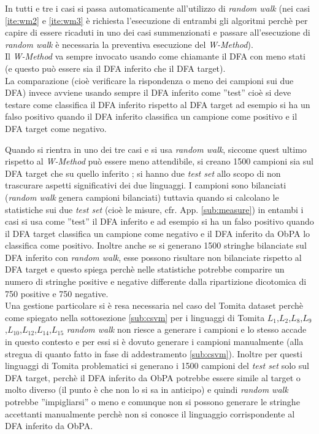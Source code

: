 In tutti e tre i casi si passa automaticamente  all'utilizzo di \textit{random walk} (nei casi \ref{ite:wm2} e \ref{ite:wm3} è richiesta l'esecuzione di entrambi gli algoritmi perchè per capire di essere ricaduti in uno dei casi summenzionati e passare all'esecuzione di \textit{random walk} è necessaria la preventiva esecuzione del \textit{W-Method}).  \\
Il \textit{W-Method} va sempre invocato usando come chiamante il \ac{DFA} con meno stati  (e questo può essere sia il \ac{DFA} inferito che il \ac{DFA} target).\\
La comparazione (cioè verificare la rispondenza o meno dei campioni sui due \ac{DFA}) invece avviene usando sempre il \ac{DFA} inferito come ''test'' cioè si deve testare come classifica il \ac{DFA} inferito rispetto al \ac{DFA} target ad esempio si ha un falso positivo quando il \ac{DFA} inferito classifica un campione come positivo e il \ac{DFA} target come negativo.

Quando si rientra in uno dei tre casi e si usa \textit{random walk}, siccome quest ultimo rispetto al \textit{W-Method} può essere meno attendibile, si creano 1500 campioni sia sul \ac{DFA} target che su quello inferito ; si hanno due \textit{test set}  allo scopo di non trascurare aspetti significativi dei due linguaggi.  I campioni  sono bilanciati (\textit{random walk} genera campioni bilanciati)  tuttavia quando si calcolano le statistiche sui due \textit{test set} (cioè le misure, cfr. App. \ref{sub:measure}) in entambi i casi si usa come ''test'' il \ac{DFA} inferito e ad esempio si ha un falso positivo quando il \ac{DFA} target classifica un campione come negativo e il \ac{DFA} inferito da \ac{ObPA} lo classifica come positivo. Inoltre anche se si generano 1500 stringhe bilanciate sul \ac{DFA} inferito con \textit{random walk}, esse possono risultare non bilanciate rispetto al \ac{DFA} target e questo spiega perchè nelle statistiche potrebbe comparire un numero di stringhe positive e negative differente dalla ripartizione dicotomica di 750 positive e 750 negative.\\
Una gestione particolare si è resa necessaria nel caso del Tomita dataset perchè come spiegato   nella sottosezione \ref{sub:csvm} per i linguaggi di Tomita $L_1$,$L_2$,$L_8$,$L_9$,$L_{10}$,$L_{12}$,$L_{14}$,$L_{15}$  \textit{random walk} non riesce a generare i campioni e lo stesso accade in questo contesto e per essi si è dovuto generare i campioni manualmente (alla stregua di quanto fatto in fase di addestramento \ref{sub:csvm}). Inoltre per questi linguaggi di Tomita problematici si generano i 1500 campioni del \textit{test set} solo sul \ac{DFA} target, perchè il \ac{DFA} inferito da \ac{ObPA} potrebbe essere simile al target o molto diverso (il punto è che non lo si sa in anticipo) e quindi \textit{random walk} potrebbe ''impigliarsi'' o meno e comunque non si possono generare le stringhe accettanti manualmente perchè non si conosce il linguaggio corrispondente al \ac{DFA} inferito da \ac{ObPA}.\\

